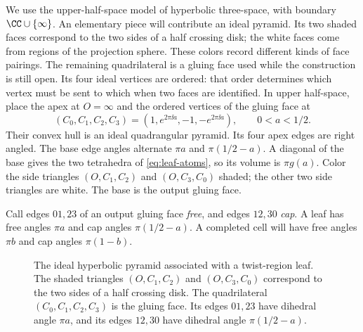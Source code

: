 We use the upper-half-space model of hyperbolic three-space, with boundary $\CC\cup\{\infty\}$. An elementary piece will contribute an ideal pyramid. Its two shaded faces correspond to the two sides of a half crossing disk; the white faces come from regions of the projection sphere. These colors record different kinds of face pairings. The remaining quadrilateral is a gluing face used while the construction is still open. Its four ideal vertices are ordered: that order determines which vertex must be sent to which when two faces are identified.
In upper half-space, place the apex at $O=\infty$ and the ordered vertices of the gluing face at
\begin{equation}\label{eq:leaf-vertices}
 (C_0,C_1,C_2,C_3)=(1,e^{2\pi\ii a},-1,-e^{2\pi\ii a}),
 \qquad 0<a<1/2.
\end{equation}
Their convex hull is an ideal quadrangular pyramid. Its four apex edges are right angled. The base edge angles alternate $\pi a$ and $\pi(1/2-a)$. A diagonal of the base gives the two tetrahedra of \eqref{eq:leaf-atoms}, so its volume is $\pi g(a)$. Color the side triangles $(O,C_1,C_2)$ and $(O,C_3,C_0)$ shaded; the other two side triangles are white. The base is the output gluing face.

Call edges $01,23$ of an output gluing face \emph{free}, and edges $12,30$ \emph{cap}. A leaf has free angles $\pi a$ and cap angles $\pi(1/2-a)$. A completed cell will have free angles $\pi b$ and cap angles $\pi(1-b)$.

\begin{figure}[ht]
\centering

\caption{The ideal hyperbolic pyramid associated with a twist-region leaf. The shaded triangles $(O,C_1,C_2)$ and $(O,C_3,C_0)$ correspond to the two sides of a half crossing disk. The quadrilateral $(C_0,C_1,C_2,C_3)$ is the gluing face. Its edges $01,23$ have dihedral angle $\pi a$, and its edges $12,30$ have dihedral angle $\pi(1/2-a)$.}\label{fig:leaf}
\end{figure}

